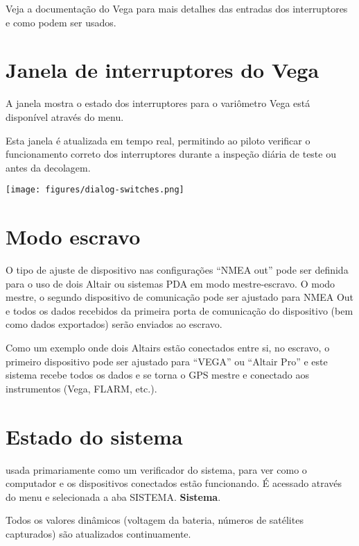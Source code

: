Veja a documentação do Vega para mais detalhes das entradas dos interruptores e como podem ser usados.


\section{Janela de interruptores do Vega}

A janela mostra o estado dos interruptores para o variômetro Vega está disponível através do menu.

Esta janela é atualizada em tempo real, permitindo ao piloto verificar o funcionamento correto dos interruptores durante a inspeção diária de teste ou antes da decolagem.  

\begin{center}
\texttt{[image: figures/dialog-switches.png]}
\end{center}

\section{Modo escravo}

O tipo de ajuste de dispositivo nas configurações “NMEA out” pode ser definida para o uso de dois Altair ou sistemas PDA em modo mestre-escravo.  O modo mestre, o segundo dispositivo de comunicação pode ser ajustado para NMEA Out e todos os dados recebidos da primeira porta de comunicação do dispositivo (bem como dados exportados) serão enviados ao escravo.

Como um exemplo onde dois Altairs estão conectados entre si, no escravo, o primeiro dispositivo pode ser ajustado para “VEGA” ou “Altair Pro” e este sistema recebe todos os dados e se torna o GPS mestre e conectado aos instrumentos (Vega, FLARM, etc.).


\section{Estado do sistema}\label{sec:system-status}

usada primariamente como um verificador do sistema, para ver como o computador e os dispositivos conectados estão funcionando.  É acessado através do menu e selecionada a aba SISTEMA. {\bf Sistema}.

Todos os valores dinâmicos (voltagem da bateria, números de satélites capturados) são atualizados continuamente.  

